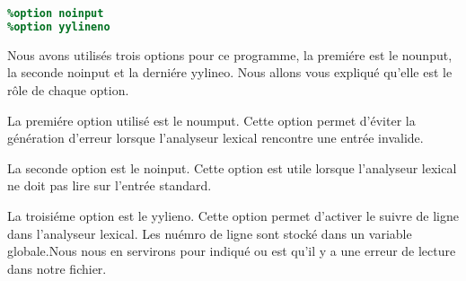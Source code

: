 \lstset{style=mystyle}
\begin{lstlisting}[language=Lex, caption=Option Lex du projet]
%option nounput
%option noinput
%option yylineno
\end{lstlisting}

Nous avons utilisés trois options pour ce programme, la premiére est le nounput, la seconde noinput et la derniére yylineo. Nous allons vous expliqué qu'elle est le rôle de chaque option.

La premiére option utilisé est le noumput. Cette option permet d'éviter la génération d'erreur lorsque l'analyseur lexical rencontre une entrée invalide.

La seconde option est le noinput. Cette option est utile lorsque l'analyseur lexical ne doit pas lire sur l'entrée standard.

La troisiéme option est le yylieno. Cette option permet d'activer le suivre de ligne dans l'analyseur lexical. Les nuémro de ligne sont stocké dans un variable globale.Nous nous en servirons pour indiqué ou est qu'il y a une erreur de lecture dans notre fichier.